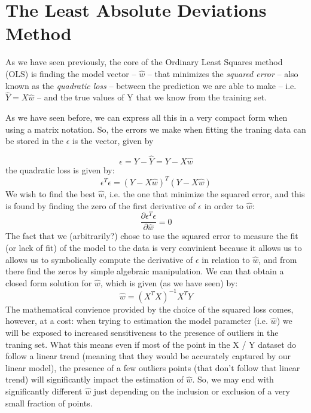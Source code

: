 \section{The Least Absolute Deviations Method}

As we have seen previously, the core of the Ordinary Least Squares method (OLS) is finding the model vector -- $\hat{w}$ -- that minimizes the \emph{squared error} -- also known as the \emph{quadratic loss} -- between the prediction we are able to make -- i.e. $\hat{Y} = X\hat{w}$ -- and the true values of Y that we know from the training set. 

As we have seen before, we can express all this in a very compact form when using a matrix notation. So,  the errors we make when fitting the traning data can be stored in the $\epsilon$ is the vector, given by

\begin{equation}
\epsilon = Y - \hat{Y} = Y - X \hat{w} 
\end{equation}
the quadratic loss is given by:
\begin{equation}
\epsilon^T \epsilon = (Y - X \hat{w})^{T}(Y - X \hat{w})
\end{equation}
We wish to find the best $\hat{w}$, i.e. the one that minimize the squared error, and this is found by finding the zero of the first derivative of $\epsilon$ in order to $\hat{w}$:
\begin{equation}
\frac{\partial \epsilon^T \epsilon}{\partial \hat{w}} = 0
\end{equation}
The fact that we (arbitrarily?) chose to use the squared error to measure the fit (or lack of fit) of the model to the data is very convinient because it allows us to allows us to symbolically compute the derivative of $\epsilon$ in relation to $\hat{w}$, and from there find the zeros by simple algebraic manipulation. We can that obtain a closed form solution for $\hat{w}$, which is given (as we have seen) by:
\begin{equation}
\hat{w} = (X^T X)^{-1} X^T Y
\end{equation}
The mathematical convience provided by the choice of the squared loss comes, however, at a cost: when trying to estimation the model parameter (i.e. $\hat{w}$) we will be exposed to increased sensitiveness to the presence of outliers in the traning set. What this means even if most of the point in the X / Y dataset do follow a linear trend (meaning that they would be accurately captured by our linear model), the presence of a few outliers points (that don't follow that linear trend) will significantly impact the estimation of $\hat{w}$. So, we may end with significantly different $\hat{w}$ just depending on the inclusion or exclusion of a very small fraction of points. 

